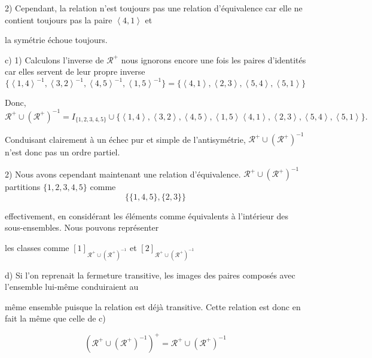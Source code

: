 \documentclass{article}
\newcommand{\tuple}[1]{\ensuremath{\left\langle #1 \right\rangle}}
\begin{document}
2) Cependant, la relation n’est toujours pas une relation d’équivalence car elle ne contient toujours pas la paire  $\tuple{4,1}$ et 

la symétrie échoue toujours.

\vspace{0.3cm}

c) 1)
Calculons l'inverse de $\mathcal{R}^{+}$ nous ignorons encore une fois les paires d'identités car elles servent de leur propre inverse
$$ \{ \tuple{1,4}^{-1},\tuple{3,2}^{-1},\tuple{4,5}^{-1},\tuple{1,5}^{-1} \} = 
\{ \tuple{4,1},\tuple{2,3},\tuple{5,4},\tuple{5,1} \}
$$

Donc,
$$ \mathcal{R}^{+} \cup (\mathcal{R}^{+})^{-1} = I_{\{1,2,3,4,5\}}\cup \{ \tuple{1,4},\tuple{3,2},\tuple{4,5},\tuple{1,5} 
\tuple{4,1},\tuple{2,3},\tuple{5,4},\tuple{5,1} \}.
$$

Conduisant clairement à un échec pur et simple de l'antisymétrie, $\mathcal{R}^{+} \cup (\mathcal{R}^{+})^{-1}$ n'est donc pas un ordre partiel.

2) Nous avons cependant maintenant une relation d'équivalence. $\mathcal{R}^{+} \cup (\mathcal{R}^{+})^{-1}$ partitions $ \{ 1,2,3,4,5 \}$ comme
$$\{ \{ 1,4,5 \} ,\{ 2,3 \} \}$$


effectivement, en considérant les éléments comme équivalents à l'intérieur des sous-ensembles. Nous pouvons représenter 

les classes comme $ [1]_{\mathcal{R}^{+} \cup (\mathcal{R}^{+})^{-1}} $ et $ [2]_{\mathcal{R}^{+} \cup (\mathcal{R}^{+})^{-1}} $

\vspace{0.3cm}

d) Si l'on reprenait la fermeture transitive, les images des paires composés avec l'ensemble lui-même conduiraient au 

même ensemble puisque la relation est déjà transitive. Cette relation est donc en fait la même que celle de c) 

$$(\mathcal{R}^{+} \cup (\mathcal{R}^{+})^{-1})^+ = \mathcal{R}^{+} \cup (\mathcal{R}^{+})^{-1}$$
\end{document}
